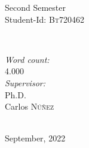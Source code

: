 \documentclass[12pt, a4paper]{article}
\begin{document}
\begin{titlepage}
\begin{minipage}{0.4\textwidth}
\begin{flushleft}
        Second Semester \\                      %
        Student-Id: \textsc{Bt720462}                  %
    \end{flushleft}
    \end{minipage}
    ~
    \begin{minipage}{0.4\textwidth}
    \begin{flushright} \large
       \emph{Word count:} \\
        4.000 \\                                %
    \vspace{\baselineskip}
    \emph{Supervisor:} \\ 
        Ph.D.\\
        Carlos \textsc{Núñez} %
    
    \end{flushright}
    \end{minipage}\\[2cm]
    {\large September, 2022}\\[2cm]             %
    
    
    
    \vfill                                  %
    \end{titlepage}



\end{document}
